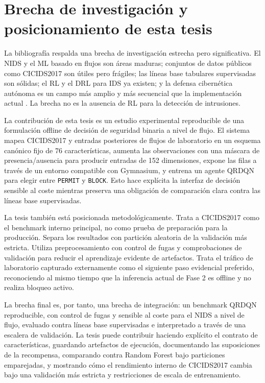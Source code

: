\section{Brecha de investigación y posicionamiento de esta tesis}

La bibliografía respalda una brecha de investigación estrecha pero significativa. El NIDS y el ML basado en flujos son áreas maduras; conjuntos de datos públicos como CICIDS2017 son útiles pero frágiles; las líneas base tabulares supervisadas son sólidas; el RL y el DRL para IDS ya existen; y la defensa cibernética autónoma es un campo más amplio y más secuencial que la implementación actual \parencite{Ring2019DatasetSurvey,LiuLang2019IDSSurvey,Yang2024DRLNIDSSurvey,Kheddar2025RLIDSReview}. La brecha no es la ausencia de RL para la detección de intrusiones.

La contribución de esta tesis es un estudio experimental reproducible de una formulación offline de decisión de seguridad binaria a nivel de flujo. El sistema mapea CICIDS2017 y entradas posteriores de flujos de laboratorio en un esquema canónico fijo de 76 características, aumenta las observaciones con una máscara de presencia/ausencia para producir entradas de 152 dimensiones, expone las filas a través de un entorno compatible con Gymnasium, y entrena un agente QRDQN para elegir entre \texttt{PERMIT} y \texttt{BLOCK}. Esto hace explícita la interfaz de decisión sensible al coste mientras preserva una obligación de comparación clara contra las líneas base supervisadas.

La tesis también está posicionada metodológicamente. Trata a CICIDS2017 como el benchmark interno principal, no como prueba de preparación para la producción. Separa los resultados con partición aleatoria de la validación más estricta. Utiliza preprocesamiento con control de fugas y comprobaciones de validación para reducir el aprendizaje evidente de artefactos. Trata el tráfico de laboratorio capturado externamente como el siguiente paso evidencial preferido, reconociendo al mismo tiempo que la inferencia actual de Fase 2 es offline y no realiza bloqueo activo.

La brecha final es, por tanto, una brecha de integración: un benchmark QRDQN reproducible, con control de fugas y sensible al coste para el NIDS a nivel de flujo, evaluado contra líneas base supervisadas e interpretado a través de una escalera de validación. La tesis puede contribuir haciendo explícito el contrato de características, guardando artefactos de ejecución, documentando las suposiciones de la recompensa, comparando contra Random Forest bajo particiones emparejadas, y mostrando cómo el rendimiento interno de CICIDS2017 cambia bajo una validación más estricta y restricciones de escala de entrenamiento.

